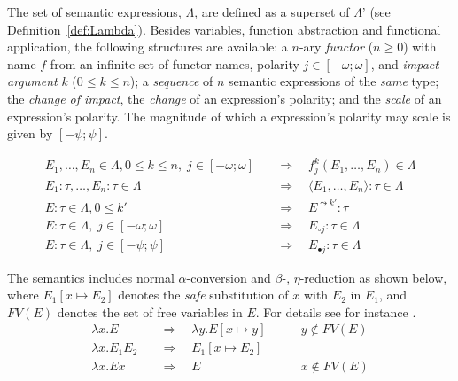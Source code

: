 \begin{definition}
The set of semantic expressions, $\Lambda$, are defined as a superset of $\Lambda$' (see Definition~\ref{def:Lambda}). Besides variables, function abstraction and functional application, the following structures are available: a $n$-ary \emph{functor} ($n \geq 0$) with name $f$ from an infinite set of functor names, polarity $j \in [-\omega;\omega]$, and \emph{impact argument} $k$ ($0 \leq k \leq n$); a \emph{sequence} of $n$ semantic expressions of the \emph{same} type; the \emph{change of impact}, the \emph{change} of an expression's polarity; and the \emph{scale} of an expression's polarity. The magnitude of which a expression's polarity may scale is given by $[-\psi; \psi]$.

\begin{align}
 E_1, \ldots, E_n \in \Lambda, 0 \leq k \leq n, \; j \in [-\omega;\omega]         &\quad \Rightarrow \quad f^k_j(E_1, \ldots, E_n) \in \Lambda \tag{Functor} \\
 E_1 : \tau, \ldots, E_n : \tau \in \Lambda     &\quad \Rightarrow \quad  \langle E_1, \ldots, E_n \rangle  : \tau \in \Lambda \tag{Sequence} \\
 E : \tau \in \Lambda, 0 \leq k' &\quad \Rightarrow \quad E^{\leadsto k'} : \tau \tag{Impact change} \\
 E : \tau \in \Lambda, \; j \in [-\omega;\omega]      &\quad \Rightarrow \quad  E_{\circ
 j}  : \tau \in \Lambda \tag{Change}  \\ 
 E : \tau \in \Lambda, \; j \in [-\psi;\psi]      &\quad \Rightarrow \quad  E_{\bullet j}  : \tau \in \Lambda \tag{Scale} 
\end{align}
\vspace{.3em}

The semantics includes normal $\alpha$-conversion and $\beta$-, $\eta$-reduction as shown below, where $E_1[x \mapsto E_2]$ denotes the \emph{safe} substitution of $x$ with $E_2$ in $E_1$, and $\mathit{FV}(E)$ denotes the set of free variables in $E$. For details see for instance \cite{TODO}.
\begin{align}
 \lambda x . E &\quad \Rightarrow \quad \lambda y . E[x \mapsto y]
 \tag{$\alpha$-conversion} \quad\quad &y \not \in FV(E) \\
 \lambda x . E_1 E_2 &\quad \Rightarrow \quad E_1[x \mapsto E_2]
 \tag{$\beta$-reduction} \\
\lambda x . E x &\quad \Rightarrow \quad E
 \tag{$\eta$-reduction} \quad\quad &x \not \in FV(E) 
\end{align}
\vspace{.3em}


\end{definition}
